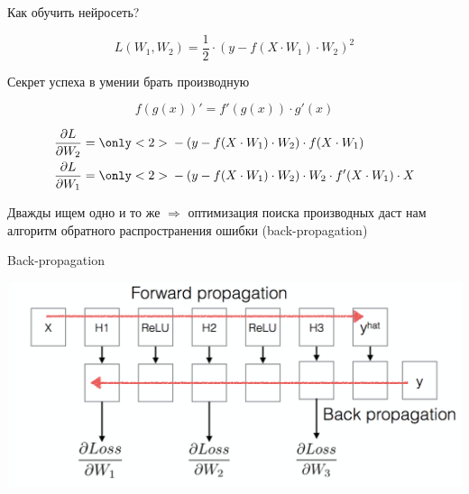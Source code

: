 \documentclass[notes,12pt, aspectratio=169]{beamer}
\begin{document}
\begin{frame}{Как обучить нейросеть?}

\[ L(W_1, W_2) =  \frac{1}{2} \cdot (y - f(X \cdot W_1) \cdot W_2)^2\]

\begin{center}
\alert{Секрет успеха в умении брать производную}
\end{center}

\pause

\[ \boxed{ f(g(x))' = f'(g(x)) \cdot g'(x) }  \]

\pause

\begin{equation*} 
\begin{aligned} 
\frac{\partial L}{\partial W_2} &=   { \only<2>{ \color{red}} - (y - f(X \cdot W_1) \cdot W_2) } \cdot f(X \cdot W_1) \\
\frac{\partial L}{\partial W_1} &= { \only<2>{ \color{red}}  - (y - f(X \cdot W_1) \cdot W_2) } \cdot W_2 \cdot  f'(X \cdot W_1) \cdot X 
\end{aligned}
\end{equation*}

\vfill

\pause

\alert{Дважды ищем одно и то же $\Rightarrow$ оптимизация поиска производных даст нам алгоритм обратного распространения ошибки (back-propagation)}
\end{frame}


\begin{frame}{Back-propagation}
	\begin{center}
		\includegraphics[width=.8\linewidth]{backpropagation.png}
	\end{center}
\end{frame}
\end{document}
